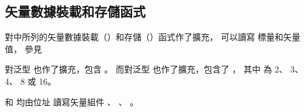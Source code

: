 \subsection[sec:vectorLsFuncHalf]{矢量數據裝載和存儲函式}

對中所列的矢量數據裝載（）和存儲（）函式作了擴充，
可以讀寫  標量和矢量值，
參見

對泛型  也作了擴充，包含 。
而對泛型  也作了擴充，包含了 ，
其中  為 2、 3、 4、 8 或 16。

\startnotepar
{} 和 
均由位址  讀寫矢量組件 、 、 。
\stopnotepar

{}
